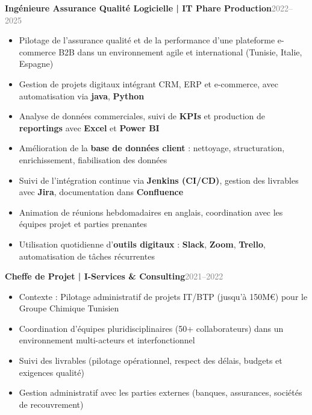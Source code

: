 \documentclass[11pt,a4paper]{article}
\newenvironment{experience}[2]{%
  \vspace{0.1em}
  \noindent\textbf{\color{accentcolor}#1}\hfill\textcolor{graytext}{#2}
  \vspace{-0.1em}
  \begin{itemize}
}{%
  \end{itemize}
  \vspace{0.1em}
}
\begin{document}
\begin{experience}{Ingénieure Assurance Qualité Logicielle | IT Phare Production}{2022--2025}
  \item Pilotage de l’assurance qualité et de la performance d’une plateforme e-commerce B2B dans un environnement agile et international (Tunisie, Italie, Espagne)
  \item Gestion de projets digitaux intégrant CRM, ERP et e-commerce, avec automatisation via \textbf{java}, \textbf{Python}
  \item Analyse de données commerciales, suivi de \textbf{KPIs} et production de \textbf{reportings} avec \textbf{Excel} et \textbf{Power BI}
  \item Amélioration de la \textbf{base de données client} : nettoyage, structuration, enrichissement, fiabilisation des données
  \item Suivi de l'intégration continue via \textbf{Jenkins (CI/CD)}, gestion des livrables avec \textbf{Jira}, documentation dans \textbf{Confluence}
  \item Animation de réunions hebdomadaires en anglais, coordination avec les équipes projet et parties prenantes
  \item Utilisation quotidienne d’\textbf{outils digitaux} : \textbf{Slack}, \textbf{Zoom}, \textbf{Trello}, automatisation de tâches récurrentes
\end{experience}


\begin{experience}{Cheffe de Projet | I-Services \& Consulting}{2021--2022}
  \item Contexte : Pilotage administratif de projets IT/BTP (jusqu’à 150M€) pour le Groupe Chimique Tunisien
  \item Coordination d’équipes pluridisciplinaires (50+ collaborateurs) dans un environnement multi-acteurs et interfonctionnel
  \item Suivi des livrables (pilotage opérationnel, respect des délais, budgets et exigences qualité)
  \item Gestion administratif avec les parties externes (banques, assurances, sociétés de recouvrement)
 
\end{experience}
\end{document}
